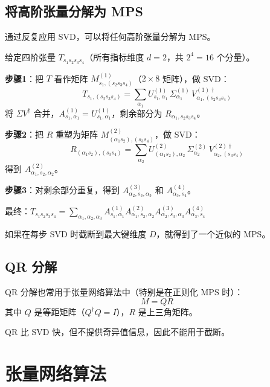 \documentclass[12pt,a4paper]{ctexart}
\begin{document}
\subsection{将高阶张量分解为 MPS}

通过反复应用 SVD，可以将任何高阶张量分解为 MPS。

\begin{examplebox}
给定四阶张量 $T_{s_1 s_2 s_3 s_4}$（所有指标维度 $d=2$，共 $2^4 = 16$ 个分量）。

\textbf{步骤1}：把 $T$ 看作矩阵 $M^{(1)}_{s_1, (s_2 s_3 s_4)}$（$2 \times 8$ 矩阵），做 SVD：
\[
T_{s_1, (s_2 s_3 s_4)} = \sum_{\alpha_1} U^{(1)}_{s_1, \alpha_1} \, \Sigma^{(1)}_{\alpha_1} \, V^{(1)\dagger}_{\alpha_1, (s_2 s_3 s_4)}
\]
将 $\Sigma V^\dagger$ 合并，$A^{(1)}_{s_1, \alpha_1} = U^{(1)}_{s_1, \alpha_1}$，剩余部分为 $R_{\alpha_1, s_2 s_3 s_4}$。

\textbf{步骤2}：把 $R$ 重塑为矩阵 $M^{(2)}_{(\alpha_1 s_2), (s_3 s_4)}$，做 SVD：
\[
R_{(\alpha_1 s_2), (s_3 s_4)} = \sum_{\alpha_2} U^{(2)}_{(\alpha_1 s_2), \alpha_2} \, \Sigma^{(2)}_{\alpha_2} \, V^{(2)\dagger}_{\alpha_2, (s_3 s_4)}
\]
得到 $A^{(2)}_{\alpha_1, s_2, \alpha_2}$。

\textbf{步骤3}：对剩余部分重复，得到 $A^{(3)}_{\alpha_2, s_3, \alpha_3}$ 和 $A^{(4)}_{\alpha_3, s_4}$。

最终：$T_{s_1 s_2 s_3 s_4} = \sum_{\alpha_1, \alpha_2, \alpha_3} A^{(1)}_{s_1, \alpha_1} A^{(2)}_{\alpha_1, s_2, \alpha_2} A^{(3)}_{\alpha_2, s_3, \alpha_3} A^{(4)}_{\alpha_3, s_4}$

如果在每步 SVD 时截断到最大键维度 $D$，就得到了一个近似的 MPS。
\end{examplebox}

\subsection{QR 分解}

QR 分解也常用于张量网络算法中（特别是在正则化 MPS 时）：
\begin{equation}
    M = QR
\end{equation}
其中 $Q$ 是等距矩阵（$Q^\dagger Q = I$），$R$ 是上三角矩阵。

QR 比 SVD 快，但不提供奇异值信息，因此不能用于截断。

\section{张量网络算法}
\end{document}
